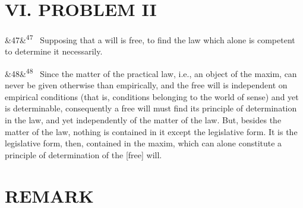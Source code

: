 \documentclass[12pt]{article}
\newcommand{\para}[1][]{\par\noindent\ifx&#1&\else\textsuperscript{\footnotesize #1}~\fi}
\begin{document}
\section*{VI. PROBLEM II}

\para[47] Supposing that a will is free, to find the law which alone is competent to determine it necessarily.

\para[48] Since the matter of the practical law, i.e., an object of the maxim, can never be given otherwise than empirically, and the free will is independent on empirical conditions (that is, conditions belonging to the world of sense) and yet is determinable, consequently a free will must find its principle of determination in the law, and yet independently of the matter of the law. But, besides the matter of the law, nothing is contained in it except the legislative form. It is the legislative form, then, contained in the maxim, which can alone constitute a principle of determination of the [free] will.

\section*{REMARK}
\end{document}
